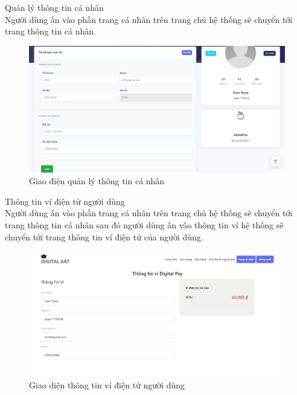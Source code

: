 \documentclass{article}
\begin{document}
{{{{{{{{{{{{{{{{{\begin{center}
\begin{figure}[htp]
		\end{figure}
	\end{center}
}
\newpage
{\large 
	\indent	Quản lý thông tin cá nhân\\
		{\large
		Người dùng ấn vào phần trang cá nhân trên trang chủ hệ thống sẽ chuyển tới trang thông tin cá nhân.}
	\begin{center}
		\begin{figure}[htp]
			\begin{center}
				\includegraphics[scale=.350]{anh36.png}
			\end{center}
			\caption{Giao điện quản lý thông tin cá nhân}
			
		\end{figure}
	\end{center}
}


\newpage
{\large  
	\indent Thông tin ví điện tử người dùng\\
		{\large
		Người dùng ấn vào phần trang cá nhân trên trang chủ hệ thống sẽ chuyển tới trang thông tin cá nhân sau đó người dùng ấn vào thông tin ví  hệ thống sẽ chuyển tới trang thông tin ví điện tử của người dùng.}
	\begin{center}
		\begin{figure}[htp]
			\begin{center}
				\includegraphics[scale=.400]{anh38.png}
			\end{center}
			\caption{Giao diện thông tin ví điện tử người dùng}
			

\end{figure}
\end{center}}}}}}}}}}}}}}}}}}
\end{document}
